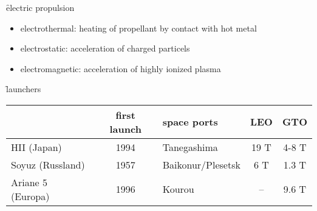 \f{electric propulsion}
\begin{itemize}
 \item electrothermal: heating of propellant by contact with hot metal
 \item electrostatic: acceleration of charged particels 
 \item electromagnetic: acceleration of highly ionized plasma
\end{itemize}

\f{launchers}\\
\begin{tabular}{l|clcc}
 & first launch & space ports& LEO & GTO \\
 \hline
 HII (Japan) & 1994 & Tanegashima& 19 T & 4-8 T\\
 Soyuz (Russland)& 1957 & Baikonur/Plesetsk& 6 T& 1.3 T\\
 Ariane 5 (Europa) & 1996& Kourou& -- & 9.6 T \\
\end{tabular}
